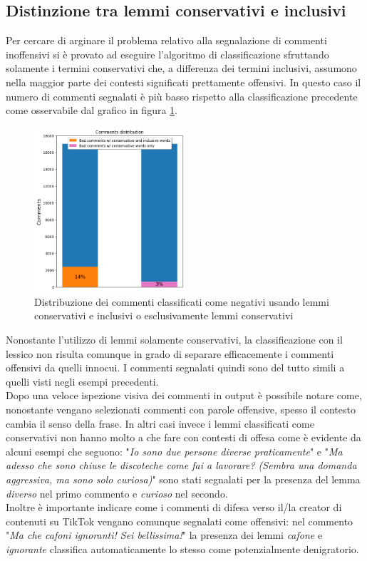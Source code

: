 \subsection{Distinzione tra lemmi conservativi e inclusivi}
    
    Per cercare di arginare il problema relativo alla segnalazione di commenti inoffensivi si è provato ad eseguire l'algoritmo di classificazione sfruttando solamente i termini conservativi che, a differenza dei termini inclusivi, assumono nella maggior parte dei contesti significati prettamente offensivi. In questo caso il numero di commenti segnalati è più basso rispetto alla classificazione precedente come osservabile dal grafico in figura \ref{fig:comments_distribution_conservative_barplot}.
    
    \begin{figure}[h]
        \centering
        \includegraphics[width=0.5\textwidth]{pics/comments distribution conservative.png}
        \caption{Distribuzione dei commenti classificati come negativi usando lemmi conservativi e inclusivi o esclusivamente lemmi conservativi}
        \label{fig:comments_distribution_conservative_barplot}
    \end{figure}
    
    Nonostante l'utilizzo di lemmi solamente conservativi, la classificazione con il lessico non risulta comunque in grado di separare efficacemente i commenti offensivi da quelli innocui. I commenti segnalati quindi sono del tutto simili a quelli visti negli esempi precedenti. \\
    Dopo una veloce ispezione visiva dei commenti in output è possibile notare come, nonostante vengano selezionati commenti con parole offensive, spesso il contesto cambia il senso della frase. In altri casi invece i lemmi classificati come conservativi non hanno molto a che fare con contesti di offesa come è evidente da alcuni esempi che seguono: "\textit{Io sono due persone diverse praticamente}" e "\textit{Ma adesso che sono chiuse le discoteche come fai a lavorare? (Sembra una domanda aggressiva, ma sono solo curiosa)}" sono stati segnalati per la presenza del lemma \textit{diverso} nel primo commento e \textit{curioso} nel secondo.\\
    Inoltre è importante indicare come i commenti di difesa verso il/la creator di contenuti su TikTok vengano comunque segnalati come offensivi: nel commento "\textit{Ma che cafoni ignoranti! Sei bellissima!}" la presenza dei lemmi \textit{cafone} e \textit{ignorante} classifica automaticamente lo stesso come potenzialmente denigratorio.
    
